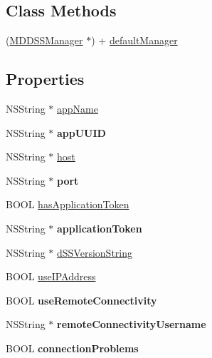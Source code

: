 \subsection*{Class Methods}
\begin{DoxyCompactItemize}
\item 
(\hyperlink{interface_m_d_d_s_s_manager}{M\-D\-D\-S\-S\-Manager} $\ast$) + \hyperlink{interface_m_d_d_s_s_manager_af0359d38979df1d414575dfb7aa6b537}{default\-Manager}
\end{DoxyCompactItemize}
\subsection*{Properties}
\begin{DoxyCompactItemize}
\item 
N\-S\-String $\ast$ \hyperlink{interface_m_d_d_s_s_manager_a27147ce2bf5c9186c96503588983c047}{app\-Name}
\item 
\hypertarget{interface_m_d_d_s_s_manager_abc7e1e14ad609adcf21091d1858eb491}{N\-S\-String $\ast$ {\bfseries app\-U\-U\-I\-D}}\label{interface_m_d_d_s_s_manager_abc7e1e14ad609adcf21091d1858eb491}

\item 
N\-S\-String $\ast$ \hyperlink{interface_m_d_d_s_s_manager_a55aa29ea7dc235519473b2e4ea44c48c}{host}
\item 
\hypertarget{interface_m_d_d_s_s_manager_a2ff1c553be5c3e501021e1d13afdd634}{N\-S\-String $\ast$ {\bfseries port}}\label{interface_m_d_d_s_s_manager_a2ff1c553be5c3e501021e1d13afdd634}

\item 
B\-O\-O\-L \hyperlink{interface_m_d_d_s_s_manager_a25dada9b29593dcd220590d8fdabc58a}{has\-Application\-Token}
\item 
\hypertarget{interface_m_d_d_s_s_manager_a9c7d4d54ae3f3d0a182543929310549d}{N\-S\-String $\ast$ {\bfseries application\-Token}}\label{interface_m_d_d_s_s_manager_a9c7d4d54ae3f3d0a182543929310549d}

\item 
N\-S\-String $\ast$ \hyperlink{interface_m_d_d_s_s_manager_a49c80f7f7f2042658136095fe9f6928f}{d\-S\-S\-Version\-String}
\item 
B\-O\-O\-L \hyperlink{interface_m_d_d_s_s_manager_a4851a2746d573ed0bceddef07fd520f7}{use\-I\-P\-Address}
\item 
\hypertarget{interface_m_d_d_s_s_manager_a68da4ee4913a60d78c689bcb38cd6373}{B\-O\-O\-L {\bfseries use\-Remote\-Connectivity}}\label{interface_m_d_d_s_s_manager_a68da4ee4913a60d78c689bcb38cd6373}

\item 
\hypertarget{interface_m_d_d_s_s_manager_a7df48bb5608e079312b3e0af683bb42f}{N\-S\-String $\ast$ {\bfseries remote\-Connectivity\-Username}}\label{interface_m_d_d_s_s_manager_a7df48bb5608e079312b3e0af683bb42f}

\item 
\hypertarget{interface_m_d_d_s_s_manager_adbef8c418bba953e19820a145102160f}{B\-O\-O\-L {\bfseries connection\-Problems}}\label{interface_m_d_d_s_s_manager_adbef8c418bba953e19820a145102160f}

\end{DoxyCompactItemize}


